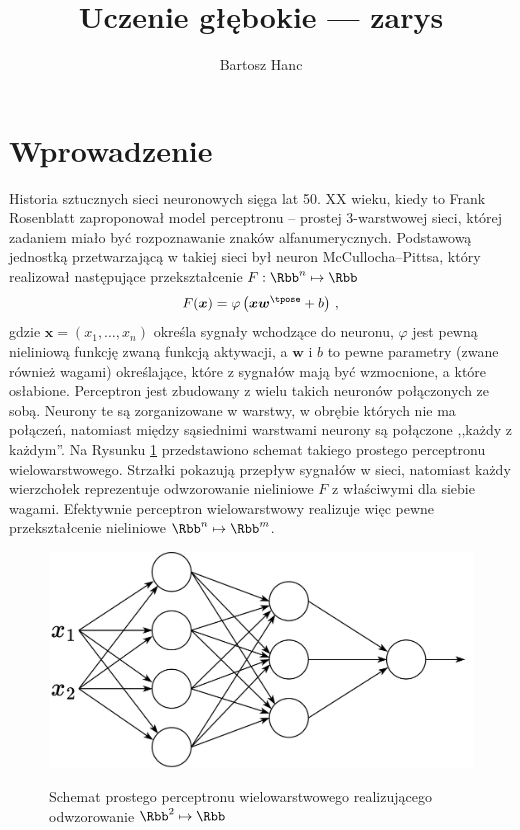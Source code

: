 \documentclass{myclass}
\author{Bartosz Hanc}
\title{Uczenie głębokie --- zarys}
\begin{document}
\maketitle

\section{Wprowadzenie}

Historia sztucznych sieci neuronowych sięga lat 50. XX wieku, kiedy to Frank Rosenblatt zaproponował
model perceptronu -- prostej 3-warstwowej sieci, której zadaniem miało być rozpoznawanie znaków
alfanumerycznych. Podstawową jednostką przetwarzającą w takiej sieci był neuron McCullocha--Pittsa,
który realizował następujące przekształcenie \(F: \Rbb^n \mapsto \Rbb\)
\[
    F(\bm{x}) = \varphi \left( \bm{x} \bm{w}^\tpose + b \right)\,,
\]
gdzie \(\bm{x} = (x_1, \ldots, x_n)\) określa sygnały wchodzące do neuronu, \(\varphi\) jest pewną
nieliniową funkcję zwaną funkcją aktywacji, a \(\bm{w}\) i \(b\) to pewne parametry (zwane również
wagami) określające, które z sygnałów mają być wzmocnione, a które osłabione. Perceptron jest
zbudowany z wielu takich neuronów połączonych ze sobą. Neurony te są zorganizowane w warstwy, w
obrębie których nie ma połączeń, natomiast między sąsiednimi warstwami neurony są połączone ,,każdy
z każdym''. Na Rysunku \ref{fig:nn} przedstawiono schemat takiego prostego perceptronu
wielowarstwowego. Strzałki pokazują przepływ sygnałów w sieci, natomiast każdy wierzchołek
reprezentuje odwzorowanie nieliniowe \(F\) z właściwymi dla siebie wagami. Efektywnie perceptron
wielowarstwowy realizuje więc pewne przekształcenie nieliniowe \(\Rbb^n \mapsto \Rbb^m\).

\begin{figure}[ht]
    \centering
    \includegraphics[width=0.85\linewidth]{figs/nn.png}
    \label{fig:nn}
    \caption{Schemat prostego perceptronu wielowarstwowego realizującego odwzorowanie \(\Rbb^2 \mapsto \Rbb\)}
\end{figure}
\end{document}
